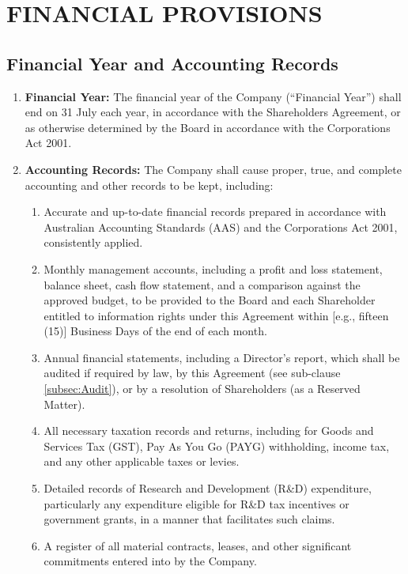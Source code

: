 \section{FINANCIAL PROVISIONS} \label{sec:financial_provisions}

\subsection{Financial Year and Accounting Records}
\begin{enumerate}[label=(\alph*)]
\item \textbf{Financial Year:} The financial year of the Company (``Financial Year'') shall end on 31 July each year, in accordance with the Shareholders Agreement, or as otherwise determined by the Board in accordance with the Corporations Act 2001.
\item \textbf{Accounting Records:} The Company shall cause proper, true, and complete accounting and other records to be kept, including:
    \begin{enumerate}[label=(\roman*)]
    \item Accurate and up-to-date financial records prepared in accordance with Australian Accounting Standards (AAS) and the Corporations Act 2001, consistently applied.
    \item Monthly management accounts, including a profit and loss statement, balance sheet, cash flow statement, and a comparison against the approved budget, to be provided to the Board and each Shareholder entitled to information rights under this Agreement within [e.g., fifteen (15)] Business Days of the end of each month.
    \item Annual financial statements, including a Director's report, which shall be audited if required by law, by this Agreement (see sub-clause \ref{subsec:Audit}), or by a resolution of Shareholders (as a Reserved Matter).
    \item All necessary taxation records and returns, including for Goods and Services Tax (GST), Pay As You Go (PAYG) withholding, income tax, and any other applicable taxes or levies.
    \item Detailed records of Research and Development (R\&D) expenditure, particularly any expenditure eligible for R\&D tax incentives or government grants, in a manner that facilitates such claims.
    \item A register of all material contracts, leases, and other significant commitments entered into by the Company.
    \end{enumerate}
\end{enumerate}

